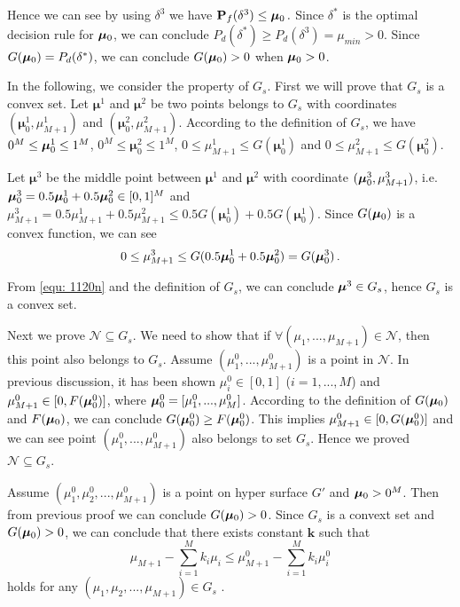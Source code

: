 Hence we can see by using $\delta^3$ we have
$
  \mathbf{P}_f(\delta^3) \leq \boldsymbol{\mu}_0\,.
$
Since $\delta^\ast $ is the optimal decision rule for $\boldsymbol{\mu}_0$, we can conclude $P_d(\delta^\ast) \geq  P_d(\delta^3) = \mu_{min} >  0$. Since $G(\boldsymbol{\mu}_0) = P_d(\delta^\ast)$, we can conclude $G(\boldsymbol{\mu}_0) > 0$ when $\boldsymbol{\mu}_0 > 0 $. 


In the following, we consider the property of $G_s$. First we will prove that $G_s$ is a convex set. 
Let $\boldsymbol{\mu}^1$ and  $\boldsymbol{\mu}^2$ be two points belongs to $G_s$ with coordinates $(\boldsymbol{\mu}^1_0, \mu_{M+1}^1)$ and $(\boldsymbol{\mu}^2_0, \mu_{M+1}^2)$. According to the definition of $G_s$, we have 
$0^M \leq \boldsymbol{\mu}_0^1 \leq 1^M$,  
$0^M \leq \boldsymbol{\mu}^2_0 \leq 1^M$, 
$0 \leq \mu_{M+1}^1 \leq G(\boldsymbol{\mu}_0^1)$ and 
$0 \leq \mu_{M+1}^2 \leq G(\boldsymbol{\mu}_0^2)$. 

Let $\boldsymbol{\mu}^3$ be the middle point between $\boldsymbol{\mu}^1$ and $\boldsymbol{\mu}^2$ with coordinate $(\boldsymbol{\mu}_0^3, \mu_{M+1}^3)$, i.e.  
$\boldsymbol{\mu}_0^3 = 0.5\boldsymbol{\mu}_0^1 + 0.5 \boldsymbol{\mu}_0^2 \in [0, 1]^M$ and 
$\mu_{M+1}^3 = 0.5 \mu_{M+1}^1 + 0.5 \mu_{M+1}^2  \leq 0.5G(\boldsymbol{\mu}_0^1) + 0.5G(\boldsymbol{\mu}_0^1)$. Since $G(\boldsymbol{\mu}_0)$ is a convex function, we can see 
\begin{equation}
\label{equ: 1120n}
0 \leq \mu_{M+1}^3 \leq G(0.5 \boldsymbol{\mu}_0^1 + 0.5\boldsymbol{\mu}_0^2) = G(\boldsymbol{\mu}_0^3)\,.
\end{equation}

From \eqref{equ: 1120n} and the definition of $G_s$, we can  conclude 
 $\boldsymbol{\mu}^3 \in G_s$, hence $G_s$  is a convex set.  

Next we prove $\mathcal{N} \subseteq G_s$. We need to show that if  $\forall (\mu_1, ..., \mu_{M+1}) \in \mathcal{N}$, then this point also belongs to $G_s$.
Assume $(\mu_1^0, ..., \mu_{M+1}^0)$ is a point in $\mathcal{N}$. 
In previous discussion, it has been shown $\mu_i^0 \in [0, 1]$ ($i = 1, ..., M$) and $\mu_{M+1}^0 \in [0, F(\boldsymbol{\mu}_0^0)]$, where $\boldsymbol{\mu}_0^0 = [\mu_1^0, ..., \mu_M^0]$. 
According to the definition of $G(\boldsymbol{\mu}_0)$ and $F(\boldsymbol{\mu}_0)$, we can conclude $G(\boldsymbol{\mu}_0^0) \geq F(\boldsymbol{\mu}_0^0)$. 
This implies $\mu_{M+1}^0 \in [0, G(\boldsymbol{\mu}_0^0)]$ and we can see point $(\mu_1^0, ..., \mu_{M+1}^0)$ also belongs to set $G_s$.
Hence we proved $\mathcal{N} \subseteq G_s$. 

Assume $(\mu_1^0, \mu_2^0, ..., \mu_{M+1}^0)$ is a point on hyper surface $G'$ and $\boldsymbol{\mu}_0 > 0^M$. Then from previous proof we can conclude $G(\boldsymbol{\mu}_0) > 0$.
Since $G_s$ is a convext set and $G(\boldsymbol{\mu}_0)>0$, we can conclude that there exists constant $\mathbf{k}$ such that 
\begin{equation}
\mu_{M+1} - \sum_{i=1}^{M}k_i\mu_i \leq \mu_{M+1}^0 - \sum_{i=1}^{M}k_i\mu_i^0
\label{mar16a0}
\end{equation}
holds for any $(\mu_1, \mu_2, ..., \mu_{M+1}) \in G_s$ \cite{LehmannTest, dantzig1951fundamental}.

